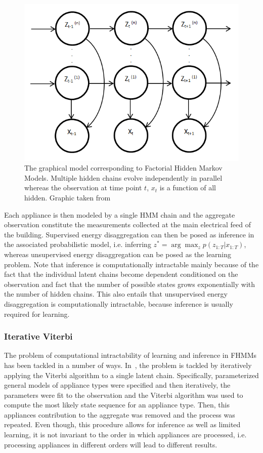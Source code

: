 \documentclass[11pt]{cmuthesis} %
\begin{document}
\begin{figure}
\centering
\includegraphics[width=0.5\linewidth]{FHMM.png}
\caption[The graphical model corresponding to Factorial Hidden Markov Models.]{The graphical model corresponding to Factorial Hidden Markov Models. Multiple hidden chains evolve independently in parallel whereas the observation at time point $t$, $x_t$ is a function of all hidden. Graphic taken from~\cite{parson2012non}}
\label{fig:fhmm}
\end{figure}

Each appliance is then modeled by a single HMM chain and the aggregate observation constitute the measurements collected at the main electrical feed of the building. Supervised energy disaggregation can then be posed as inference in the associated probabilistic model, i.e. inferring $z^* = \arg\max_z p(z_{1:T}|x_{1:T})$, whereas unsupervised energy disaggregation can be posed as the learning problem. Note that inference is computationally intractable mainly because of the fact that the individual latent chains become dependent conditioned on the observation and fact that the number of possible states grows exponentially with the number of hidden chains. This also entails that unsupervised energy disaggregation is computationally intractable, because inference is usually required for learning.

\subsubsection{Iterative Viterbi}
The problem of computational intractability of learning and inference in FHMMs has been tackled in a number of ways. In~\cite{parson2012non}, the problem is tackled by iteratively applying the Viterbi algorithm to a single latent chain. Specifically, parameterized general models of appliance types were specified and then iteratively, the parameters were fit to the observation and the Viterbi algorithm was used to compute the most likely state sequence for an appliance type. Then, this appliances contribution to the aggregate was removed and the process was repeated. Even though, this procedure allows for inference as well as limited learning, it is not invariant to the order in which appliances are processed, i.e. processing appliances in different orders will lead to different results.
\end{document}

